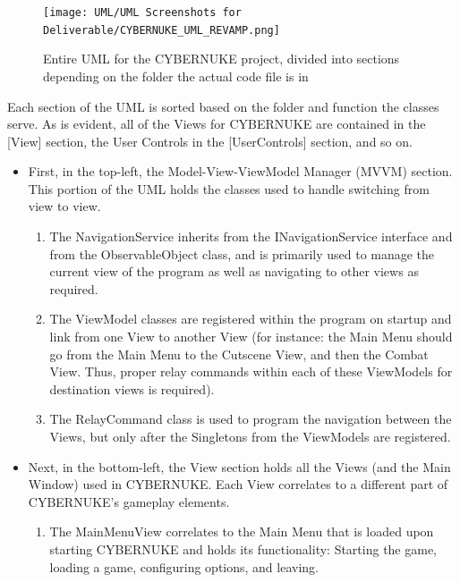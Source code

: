 \documentclass[10pt,conference,onecolumn,compsoc]{IEEEtran}
\begin{document}
\begin{figure}[h]
\centering
\texttt{[image: UML/UML Screenshots for Deliverable/CYBERNUKE\_UML\_REVAMP.png]}
\caption{Entire UML for the CYBERNUKE project, divided into sections depending on the folder the actual code file is in}
\label{uml_view}
\end{figure}

Each section of the UML is sorted based on the folder and function the classes serve. As is evident, all of the Views for CYBERNUKE are contained in the [View] section, the User Controls in the [UserControls] section, and so on.

\begin{itemize}

	\item First, in the top-left, the Model-View-ViewModel Manager (MVVM) section. This portion of the UML holds the classes used to handle switching from view to view. 

	\begin{enumerate}
	\item The NavigationService inherits from the INavigationService interface and from the ObservableObject class, and is primarily used to manage the current view of the program as well as navigating to other views as required. 
	
	\item The ViewModel classes are registered within the program on startup and link from one View to another View (for instance: the Main Menu should go from the Main Menu to the Cutscene View, and then the Combat View. Thus, proper relay commands within each of these ViewModels for destination views is required). 
	
	\item The RelayCommand class is used to program the navigation between the Views, but only after the Singletons from the ViewModels are registered.
	\end{enumerate}
	
\item Next, in the bottom-left, the View section holds all the Views (and the Main Window) used in CYBERNUKE. Each View correlates to a different part of CYBERNUKE's gameplay elements. 

	\begin{enumerate}
	\item The MainMenuView correlates to the Main Menu that is loaded upon starting CYBERNUKE and holds its functionality: Starting the game, loading a game, configuring options, and leaving. 
	

\end{enumerate}
\end{itemize}
\end{document}
